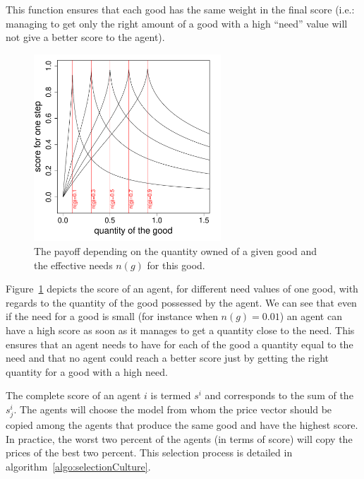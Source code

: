 \documentclass{wscpaperproc}
\begin{document}
This function ensures that each good has the same weight in the final score (i.e.: managing to get only the right amount of a good with a high ``need'' value will not give a better score to the agent).


\begin{figure}[htp]
	\begin{center}
		\includegraphics[width=7cm]{img/fitness.pdf}
	\end{center}
	\caption{The payoff depending on the quantity owned of a given good and the effective needs $n(g)$ for this good.}
	\label{fig:fit}
\end{figure}
Figure~\ref{fig:fit} depicts the score of an agent, for different need values of one good, with regards to the quantity of the good possessed by the agent. We can see that even if the need for a good is small (for instance when $n(g) = 0.01$) an agent can have a high score as soon as it manages to get a quantity close to the need. This ensures that an agent needs to have for each of the good a quantity equal to the need and that no agent could reach a better score just by getting the right quantity for a good with a high need.

The complete score of an agent $i$ is termed $s^i$ and corresponds to the sum of the $s^i_j$. The agents will choose the model from whom the price vector should be copied among the agents that produce the same good and have the highest score. In practice, the worst two percent of the agents (in terms of score) will copy the prices of the best two percent. This selection process is detailed in algorithm~\ref{algo:selectionCulture}.
\end{document}
